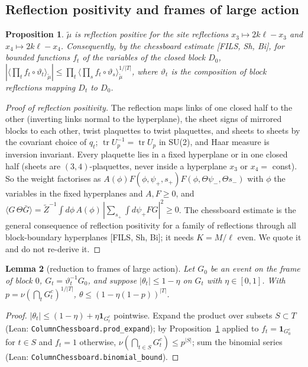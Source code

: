 \documentclass[11pt,a4paper]{article}
\newtheorem{lemma}{Lemma}[section]
\newtheorem{proposition}[lemma]{Proposition}
\theoremstyle{definition}
\theoremstyle{remark}
\newcommand{\tr}{\operatorname{tr}}
\newcommand{\code}[1]{\texttt{#1}}
\begin{document}
\subsection{Reflection positivity and frames of large action}

\begin{proposition}\label{prop:rp}
$\tilde\mu$ is reflection positive for the site reflections $x_3\mapsto2k\ell-x_3$ and $x_4\mapsto2k\ell-x_4$. Consequently, by the chessboard estimate [FILS, Sh, Bi], for bounded functions $f_t$ of the variables of the closed block $D_0$, $|\langle\prod_tf_t\circ\vartheta_t\rangle_{\tilde\mu}|\le\prod_t\langle\prod_sf_t\circ\vartheta_s\rangle_{\tilde\mu}^{1/|T|}$, where $\vartheta_t$ is the composition of block reflections mapping $D_t$ to $D_0$.
\end{proposition}
\begin{proof}[Proof of reflection positivity]
The reflection maps links of one closed half to the other (inverting links normal to the hyperplane), the sheet signs of mirrored blocks to each other, twist plaquettes to twist plaquettes, and sheets to sheets by the covariant choice of $q_t$; $\tr U_p^{-1}=\tr U_p$ in SU(2), and Haar measure is inversion invariant.
Every plaquette lies in a fixed hyperplane or in one closed half (sheets are $(3,4)$-plaquettes, never inside a hyperplane $x_3$ or $x_4=$ const).
So the weight factorises as $A(\phi)F(\phi,\psi_+,s_+)F(\phi,\Theta\psi_-,\Theta s_-)$ with $\phi$ the variables in the fixed hyperplanes and $A,F\ge0$, and $\langle G\,\Theta\bar G\rangle=\tilde Z^{-1}\int d\phi\,A(\phi)\,|\sum_{s_+}\int d\psi_+FG|^2\ge0$.
The chessboard estimate is the general consequence of reflection positivity for a family of reflections through all block-boundary hyperplanes [FILS, Sh, Bi]; it needs $K=M/\ell$ even. We quote it and do not re-derive it.
\end{proof}

\begin{lemma}[reduction to frames of large action]\label{lem:goodbad}
Let $G_0$ be an event on the frame of block $0$, $G_t=\vartheta_t^{-1}G_0$, and suppose $|\theta_t|\le1-\eta$ on $G_t$ with $\eta\in[0,1]$. With $p=\nu(\bigcap_tG^c_t)^{1/|T|}$, $\theta\le(1-\eta(1-p))^{|T|}$.
\end{lemma}
\begin{proof}
$|\theta_t|\le(1-\eta)+\eta\mathbf{1}_{G_t^c}$ pointwise. Expand the product over subsets $S\subset T$ (Lean: \code{ColumnChessboard.prod\_expand}); by Proposition~\ref{prop:rp} applied to $f_t=\mathbf{1}_{G^c_0}$ for $t\in S$ and $f_t=1$ otherwise, $\nu(\bigcap_{t\in S}G_t^c)\le p^{|S|}$; sum the binomial series (Lean: \code{ColumnChessboard.\allowbreak{}binomial\_bound}).
\end{proof}
\end{document}
